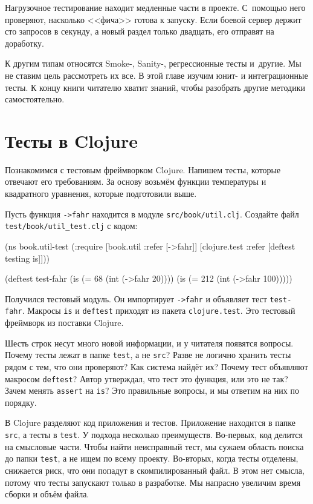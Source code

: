 
Нагрузочное тестирование находит медленные части в проекте. С~помощью него
проверяют, насколько <<фича>> готова к запуску. Если боевой сервер держит сто
запросов в секунду, а новый раздел только двадцать, его отправят на доработку.

К другим типам относятся Smoke-, Sanity-, регрессионные тесты и~другие. Мы не
ставим цель рассмотреть их все. В этой главе изучим юнит- и интеграционные
тесты. К концу книги читателю хватит знаний, чтобы разобрать другие методики
самостоятельно.

\section{Тесты в Clojure}

Познакомимся с тестовым фреймворком Clojure. Напишем тесты, которые отвечают его
требованиям. За основу возьмём функции температуры и квадратного уравнения,
которые подготовили выше.

Пусть функция \verb|->fahr| находится в модуле \verb|src/book/util.clj|.
Создайте файл \verb|test/book/util_test.clj| с кодом:


\begin{english}
  \begin{clojure}
(ns book.util-test
  (:require [book.util :refer [->fahr]]
            [clojure.test :refer [deftest testing is]]))

(deftest test-fahr
  (is (= 68 (int (->fahr 20))))
  (is (= 212 (int (->fahr 100)))))
  \end{clojure}
\end{english}

Получился тестовый модуль. Он импортирует \verb|->fahr| и объявляет тест
\verb|test-fahr|. Макросы \verb|is| и \verb|deftest| приходят из пакета
\verb|clojure.test|. Это тестовый фреймворк из поставки Clojure.

Шесть строк несут много новой информации, и у читателя появятся вопросы. Почему
тесты лежат в папке \verb|test|, а не \verb|src|? Разве не логично хранить тесты
рядом с тем, что они проверяют? Как система найдёт их?  Почему тест объявляют
макросом \verb|deftest|? Автор утверждал, что тест это функция, или это не так?
Зачем менять \verb|assert| на \verb|is|? Это правильные вопросы, и мы ответим на
них по порядку.

В Clojure разделяют код приложения и тестов. Приложение находится в папке
\verb|src|, а тесты в \verb|test|. У подхода несколько
преимуществ. Во-первых, код делится на смысловые части. Чтобы найти неисправный
тест, мы сужаем область поиска до папки \verb|test|, а не ищем по всему
проекту. Во-вторых, когда тесты отделены, снижается риск, что они попадут в
скомпилированный файл. В этом нет смысла, потому что тесты запускают только в
разработке. Мы напрасно увеличим время сборки и объём файла.

